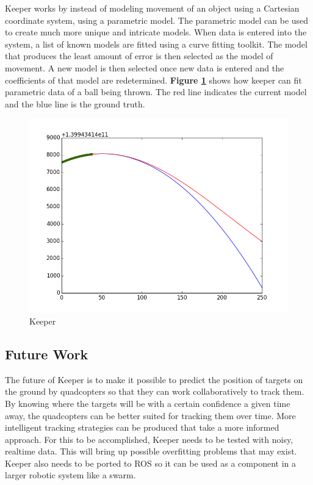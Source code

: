 \documentclass[12pt]{article}
\newcommand{\fig}[1]{\textbf{Figure \ref{fig:#1}}}
\begin{document}
Keeper works by instead of modeling  movement of an object using a Cartesian
coordinate system, using a parametric model. The parametric model can be used
to create much more unique and intricate models. When data is entered into the
system, a list of known models are fitted using a curve fitting toolkit. The
model that produces the least amount of error is then selected as the model of
movement. A new model is then selected once new data is entered and the
coefficients of that model are redetermined. \fig{keeper} shows how keeper can
fit parametric data of a ball being thrown. The red line indicates the current
model and the blue line is the ground truth.

\begin{figure}[h!]

\label{fig:keeper}

\centering

\includegraphics[width=0.8\linewidth]{figs/keeper.png}

\caption{Keeper}

\end{figure}

\subsection{Future Work}

The future of Keeper is to make it possible to predict the position of targets
on the ground by quadcopters so that they can work collaboratively to track
them. By knowing where the targets will be with a certain confidence a given
time away, the quadcopters can be better suited for tracking them over time.
More intelligent tracking strategies can be produced that take a more informed
approach. For this to be accomplished, Keeper needs to be tested with noisy,
realtime data. This will bring up possible overfitting problems that may
exist. Keeper also needs to be ported to ROS so it can be used as a component
in a larger robotic system like a swarm.
\end{document}
